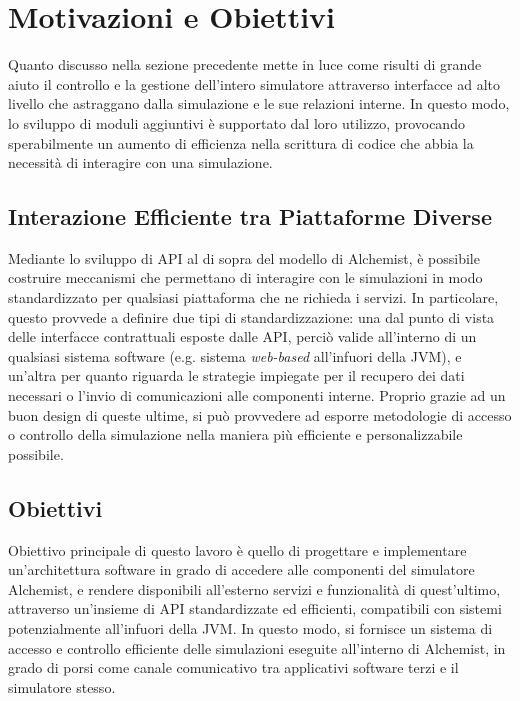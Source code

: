\section{Motivazioni e Obiettivi}\label{sec:motivations-objectives}
Quanto discusso nella sezione precedente mette in luce come risulti di grande aiuto il controllo e la gestione dell'intero simulatore attraverso interfacce ad alto livello che astraggano dalla simulazione
e le sue relazioni interne. In questo modo, lo sviluppo di moduli aggiuntivi è supportato dal loro utilizzo, provocando sperabilmente un aumento di efficienza nella scrittura di codice che abbia la necessità
di interagire con una simulazione.

\subsection{Interazione Efficiente tra Piattaforme Diverse}\label{ssec:platforms-interactions}
Mediante lo sviluppo di API al di sopra del modello di Alchemist, è possibile costruire meccanismi che permettano di interagire con le simulazioni in modo standardizzato per qualsiasi piattaforma che
ne richieda i servizi. In particolare, questo provvede a definire due tipi di standardizzazione: una dal punto di vista delle interfacce contrattuali esposte dalle API, perciò valide all'interno
di un qualsiasi sistema software (e.g. sistema \textit{web-based} all'infuori della \ac{JVM}), e un'altra per quanto riguarda
le strategie impiegate per il recupero dei dati necessari o l'invio di comunicazioni alle componenti interne. Proprio grazie ad un buon design di queste ultime, si può provvedere ad esporre metodologie
di accesso o controllo della simulazione nella maniera più efficiente e personalizzabile possibile.

\subsection{Obiettivi}\label{ssec:objectives}
Obiettivo principale di questo lavoro è quello di progettare e implementare un'architettura software in grado di accedere alle componenti del simulatore Alchemist, e rendere disponibili all'esterno
servizi e funzionalità di quest'ultimo, attraverso un'insieme di API standardizzate ed efficienti, compatibili con sistemi potenzialmente all'infuori della \ac{JVM}. In questo modo, si fornisce un
sistema di accesso e controllo efficiente delle simulazioni eseguite all'interno di Alchemist, in grado di porsi come canale comunicativo tra applicativi software terzi e il simulatore stesso.

